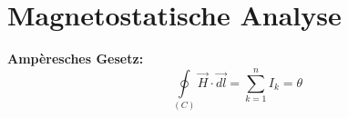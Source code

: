 \section{Magnetostatische Analyse}

\textbf{Ampèresches Gesetz:} \\
\[ \oint\limits_{(C)}\vec{H}\cdot\vec{dl} = \sum\limits_{k = 1}^{n} I_k = \theta \]

\clearpage